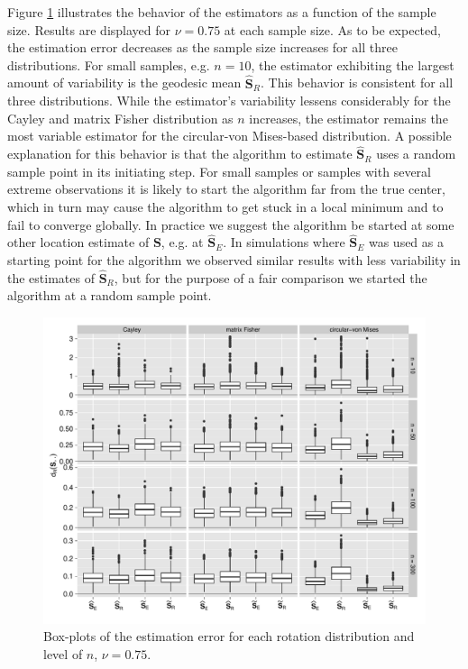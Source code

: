 \documentclass[12pt]{article}
\newcommand{\ProjMean}{{\widehat{\bm S}_E}}
\newcommand{\GeomMean}{{\widehat{\bm S}_R}}
\begin{document}
Figure \ref{fig:NBoxes} illustrates the behavior of the estimators as a function of the sample size. Results are displayed for  $\nu=0.75$ at each sample size. As to be expected, the estimation error decreases as the sample size increases for all three distributions. For small samples, e.g. $n=10$, the estimator exhibiting the largest amount of variability is the geodesic mean $\GeomMean$. This behavior is consistent for all three distributions.  While the estimator's variability lessens considerably for the Cayley and matrix Fisher distribution as $n$ increases, the estimator remains the most variable estimator for the circular-von Mises-based distribution.  A possible explanation for this behavior is that the algorithm to estimate $\GeomMean$ uses a random sample point in its initiating step.  For small samples or samples with several extreme observations it is likely to start the algorithm far from the true center, which in turn may cause the algorithm to get stuck in a local minimum and to fail to converge globally.  In practice we suggest the algorithm be started at some other location estimate of $\bm S$, e.g. at $\ProjMean$. In simulations where $\ProjMean$ was used as a starting point for the algorithm we observed  similar results with less variability in the estimates of $\GeomMean$, but for the purpose of a fair comparison we started the algorithm at a random sample point.


\begin{figure}[h!]
\centering
\includegraphics[width=1\textwidth]{Nu75AllNBoxes.pdf}
\caption{Box-plots of the estimation error for each rotation distribution and level of $n$,  $\nu=0.75$.}
\label{fig:NBoxes}
\end{figure}
\end{document}
